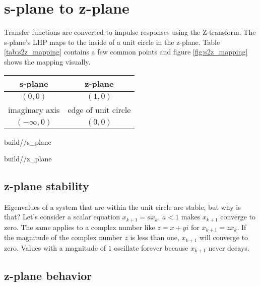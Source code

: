 \section{s-plane to z-plane}
\label{sec:s-plane_to_z-plane}

Transfer functions are converted to impulse responses using the Z-transform. The
s-plane's LHP maps to the inside of a unit circle in the z-plane. Table
\ref{tab:s2z_mapping} contains a few common points and figure
\ref{fig:s2z_mapping} shows the mapping visually.

\begin{booktable}
  \begin{tabular}{|cc|}
    \hline
    \rowcolor{headingbg}
    \textbf{s-plane} & \textbf{z-plane} \\
    \hline
    $(0, 0)$ & $(1, 0)$ \\
    imaginary axis & edge of unit circle \\
    $(-\infty, 0)$ & $(0, 0)$ \\
    \hline
  \end{tabular}
  \caption{Mapping from s-plane to z-plane}
  \label{tab:s2z_mapping}
\end{booktable}

\begin{bookfigure}
  \begin{minisvg}{2}{build/\chapterpath/s_plane}
  \end{minisvg}
  \hfill
  \begin{minisvg}{2}{build/\chapterpath/z_plane}
  \end{minisvg}
  \caption{Mapping of axes from s-plane (left) to z-plane (right)}
  \label{fig:s2z_mapping}
\end{bookfigure}

\subsection{z-plane stability}

Eigenvalues of a \gls{system} that are within the unit circle are stable, but
why is that? Let's consider a scalar equation $x_{k + 1} = ax_k$. $a < 1$ makes
$x_{k + 1}$ converge to zero. The same applies to a complex number like
$z = x + yi$ for $x_{k + 1} = zx_k$. If the magnitude of the complex number $z$
is less than one, $x_{k+1}$ will converge to zero. Values with a magnitude of
$1$ oscillate forever because $x_{k+1}$ never decays.

\subsection{z-plane behavior}

